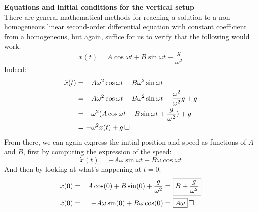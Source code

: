 \documentclass[solutions.tex]{subfiles}
\renewcommand{\qed}{\,\relax\ifmmode\Box\else$\Box$\fi}
\begin{document}
\hr
\textbf{Equations and initial conditions for the vertical setup} \\
There are general mathematical methods for reaching a solution to a
non-homogeneous linear second-order differential equation with
constant coefficient from a homogeneous, but again, suffice for us
to verify that the following would work:
\[x(t) = A\cos\omega t + B\sin\omega t + \frac{g}{\omega^2} \]
Indeed:
\begin{align*}
	\ddot x(t) &= -A\omega^2\cos\omega t - B\omega^2\sin\omega t \\
	~ &= -A\omega^2\cos\omega t - B\omega^2\sin\omega t -\frac{\omega^2}{\omega^2}g + g\\
	~ &= -\omega^2 (A\cos\omega t + B\sin\omega t + \frac{g}{\omega^2}) + g \\
	~ &= -\omega^2 x(t) +g\qed
\end{align*}
From there, we can again express the initial position and speed
as functions of $A$ and $B$, first by computing the expression of the speed:
\[ \dot x(t) = -A\omega\sin\omega t + B\omega\cos\omega t \]
And then by looking at what's happening at $t=0$:
\begin{equation*} \begin{aligned}
	x(0) = && A\cos(0) + B\sin(0)+\frac{g}{\omega^2} &= \boxed{B+\frac{g}{\omega^2}} \\
	\dot x(0) = && -A\omega\sin(0) + B\omega\cos(0) &= \boxed{A\omega}\qed
\end{aligned} \end{equation*}

\iffalse
\hr
\textbf{Inertial mass vs. gravitational mass}
\fi
\end{document}
